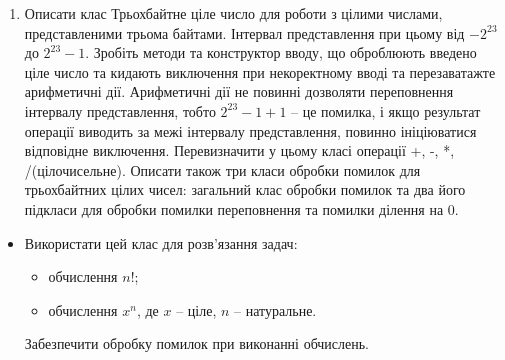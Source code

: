 \documentclass[]{article}
\begin{document}
\begin{enumerate}
\def\labelenumi{\arabic{enumi}.}
\item
  Описати клас Трьохбайтне ціле число для роботи з цілими числами,
  представленими трьома байтами. Інтервал представлення при цьому від
  \(- 2^{23}\) до \(2^{23} - 1\). Зробіть методи та конструктор вводу,
  що оброблюють введено ціле число та кидають виключення при
  некоректному вводі та перезаватажте арифметичні дії. Арифметичні дії
  не повинні дозволяти переповнення інтервалу представлення, тобто
  \(2^{23} - 1 + 1\) -- це помилка, і якщо результат операції виводить
  за межі інтервалу представлення, повинно ініціюватися відповідне
  виключення. Перевизначити у цьому класі операції +, -, *,
  /(цілочисельне). Описати також три класи обробки помилок для
  трьохбайтних цілих чисел: загальний клас обробки помилок та два його
  підкласи для обробки помилки переповнення та помилки ділення на 0.
\end{enumerate}

\begin{itemize}
\item
  Використати цей клас для розв'язання задач:

  \begin{itemize}
  \item
    обчислення \(n!\);
  \item
    обчислення \(x^{n}\), де \(x\) -- ціле, \(n\) -- натуральне.
  \end{itemize}

  Забезпечити обробку помилок при виконанні обчислень.
\end{itemize}
\end{document}
